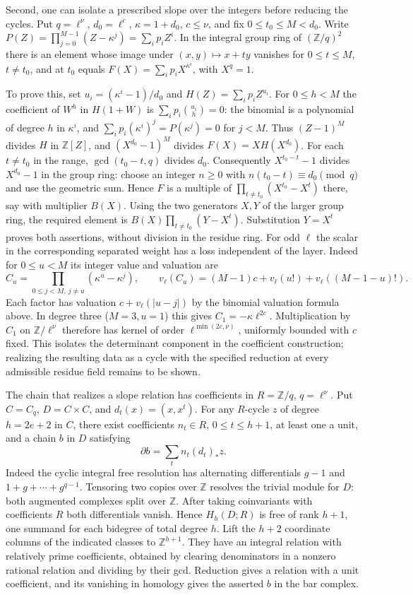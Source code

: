 \documentclass[11pt]{amsart}
\theoremstyle{definition}
\theoremstyle{remark}
\begin{document}
Second, one can isolate a prescribed slope over the integers before
reducing the cycles. Put $q=\ell^\nu$, $d_0=\ell^c$,
$\kappa=1+d_0$, $c\le\nu$, and fix $0\le t_0\le M<d_0$. Write
$P(Z)=\prod_{j=0}^{M-1}(Z-\kappa^j)=\sum_i p_i Z^i$.
In the integral group ring of $(\mathbb Z/q)^2$ there is an element
whose image under $(x,y)\mapsto x+ty$ vanishes for
$0\le t\le M$, $t\ne t_0$, and at $t_0$ equals
$F(X)=\sum_i p_iX^{\kappa^i}$, with $X^q=1$.

To prove this, set $u_i=(\kappa^i-1)/d_0$ and
$H(Z)=\sum_i p_iZ^{u_i}$. For $0\le h<M$ the coefficient of $W^h$
in $H(1+W)$ is $\sum_i p_i\binom{u_i}{h}=0$: the binomial is a
polynomial of degree $h$ in $\kappa^i$, and
$\sum_i p_i(\kappa^i)^j=P(\kappa^j)=0$ for $j<M$.
Thus $(Z-1)^M$ divides $H$ in $\mathbb Z[Z]$, and
$(X^{d_0}-1)^M$ divides $F(X)=XH(X^{d_0})$. For each
$t\ne t_0$ in the range, $\gcd(t_0-t,q)$ divides $d_0$.
Consequently $X^{t_0-t}-1$ divides $X^{d_0}-1$ in the group ring:
choose an integer $n\ge0$ with $n(t_0-t)\equiv d_0\pmod q$
and use the geometric sum. Hence $F$ is a multiple of
$\prod_{t\ne t_0}(X^{t_0}-X^t)$ there, say with multiplier $B(X)$.
Using the two generators $X,Y$ of the larger group ring, the required
element is $B(X)\prod_{t\ne t_0}(Y-X^t)$. Substitution $Y=X^t$
proves both assertions, without division in the residue ring.
For odd $\ell$ the scalar in the corresponding separated weight
has a loss independent of the layer. Indeed for $0\le u<M$ its
integer value and valuation are
\[
 C_u=\prod_{0\le j<M,\ j\ne u}(\kappa^u-\kappa^j),\qquad
 v_\ell(C_u)=(M-1)c+v_\ell(u!)+v_\ell((M-1-u)!).
\]
Each factor has valuation $c+v_\ell(|u-j|)$ by the binomial
valuation formula above. In degree three ($M=3,u=1$) this gives
$C_1=-\kappa\ell^{2c}$. Multiplication by $C_1$ on
$\mathbb Z/\ell^\nu$ therefore has kernel of order
$\ell^{\min(2c,\nu)}$, uniformly bounded with $c$ fixed.
This isolates the determinant component in the coefficient construction;
realizing the resulting data as a cycle with the specified reduction
at every admissible residue field remains to be shown.

The chain that realizes a slope relation has coefficients in
$R=\mathbb Z/q$, $q=\ell^\nu$. Put $C=C_q$, $D=C\times C$, and
$d_t(x)=(x,x^t)$. For any $R$-cycle $z$ of degree $h=2e+2$ in
$C$, there exist coefficients $n_t\in R$, $0\le t\le h+1$, at
least one a unit, and a chain $b$ in $D$ satisfying
\[
 \partial b=\sum_t n_t(d_t)_*z.
\]
Indeed the cyclic integral free resolution has alternating
differentials $g-1$ and $1+g+\cdots+g^{q-1}$. Tensoring two copies
over $\mathbb Z$ resolves the trivial module for $D$: both augmented
complexes split over $\mathbb Z$. After taking coinvariants with
coefficients $R$ both differentials vanish. Hence $H_h(D;R)$ is free
of rank $h+1$, one summand for each bidegree of total degree $h$.
Lift the $h+2$ coordinate columns of the indicated classes to
$\mathbb Z^{h+1}$. They have an integral relation with relatively
prime coefficients, obtained by clearing denominators in a nonzero
rational relation and dividing by their gcd. Reduction gives a
relation with a unit coefficient, and its vanishing in homology
gives the asserted $b$ in the bar complex.
\end{document}
